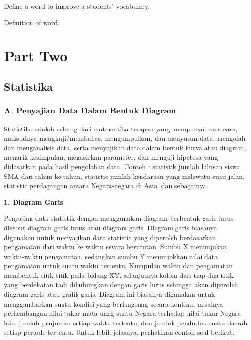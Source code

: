 \documentclass[11pt,fleqn]{book} %
\begin{document}
{Define a word to improve a students' vocabulary.

\begin{vocabulary}[Word]
Definition of word.
\end{vocabulary}


\part{Part Two}


\chapter{Statistika}

\section{A. Penyajian Data Dalam Bentuk Diagram}

	
	Statistika adalah cabang dari matematika terapan yang mempunyai cara-cara, maksudnya mengkaji/membahas, mengumpulkan, dan menyusun data, mengolah dan menganalisis data, serta menyajikan data dalam bentuk kurva atau diagram, menarik kesimpulan, menasirkan parameter, dan menguji hipotesa yang didasarkan pada hasil pengolahan data. Contoh : statistik jumlah lulusan siswa SMA dari tahun ke tahun, statistic jumlah kendaraan yang melewatu suau jalan, statistic perdagangan antara Negara-negara di Asia, dan sebagainya.

\textbf{1.	Diagram Garis}

Penyajian data statistik dengan menggunakan diagram berbentuk garis lurus disebut diagram garis lurus atau diagram garis. Diagram garis biasanya digunakan untuk menyajikan data statistic yang diperoleh berdasarkan pengamatan dari waktu ke waktu sevara berurutan.
	Sumbu X menunjukan waktu-waktu pengamatan, sedangkan sumbu Y menunjukkan nilai data pengamatan untuk suatu waktu tertentu. Kumpulan waktu dan pengamatan membentuk titik-titik pada bidang XY, selanjutnya kolom dari tiap dua titik yang berdekatan tadi dihubungkan dengan garis lurus sehingga akan diperoleh diagram garis atau grafik garis. Diagram ini biasanya digunakan untuk menggambarkan suatu kondisi yang berlangsung secara kontinu, misalnya perkembangan nilai tukar mata uang suatu Negara terhadap nilai tukar Negara lain, jumlah penjualan setiap waktu tertentu, dan jumlah penduduk suatu daerah setiap periode tertentu. Untuk lebih jelasnya, perhatikan contoh soal berikut.
	
}
\end{document}
